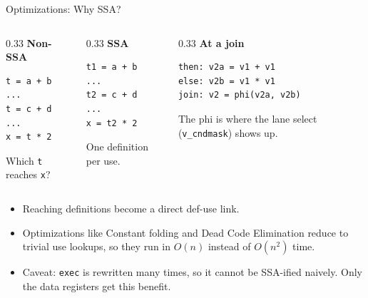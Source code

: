 \documentclass[10pt,aspectratio=169]{beamer}
\begin{document}
        \begin{frame}[fragile]{Optimizations: Why SSA?}
    \hspace*{1.2cm}\begin{minipage}{\dimexpr\textwidth-1.2cm}
    \begin{columns}[T]
    \begin{column}{0.33\textwidth}
    \textbf{Non-SSA}
{\scriptsize\begin{verbatim}
t = a + b
...
t = c + d
...
x = t * 2
\end{verbatim}}
    {\color{darkgray}\scriptsize Which \texttt{t} reaches \texttt{x}?}
    \end{column}
    \begin{column}{0.33\textwidth}
    \textbf{SSA}
{\scriptsize\begin{verbatim}
t1 = a + b
...
t2 = c + d
...
x = t2 * 2
\end{verbatim}}
    {\color{darkgray}\scriptsize One definition per use.}
    \end{column}
    \begin{column}{0.33\textwidth}
    \textbf{At a join}
{\scriptsize\begin{verbatim}
then: v2a = v1 + v1
else: v2b = v1 * v1
join: v2 = phi(v2a, v2b)
\end{verbatim}}
    {\color{darkgray}\scriptsize The phi is where the lane select (\texttt{v\_cndmask}) shows up.}
    \end{column}
    \end{columns}
    \vspace{0.5em}
    \begin{itemize}
        \item Reaching definitions become a direct def-use link. 
        \item Optimizations like Constant folding and Dead Code Elimination reduce to trivial
          use lookups, so they run in $O(n)$ instead of $O(n^2)$ time.
        \item Caveat: \texttt{exec} is rewritten many times, so it cannot be SSA-ified naively. Only the data registers get this benefit.
    \end{itemize}
    \end{minipage}
    \end{frame}
\end{document}

